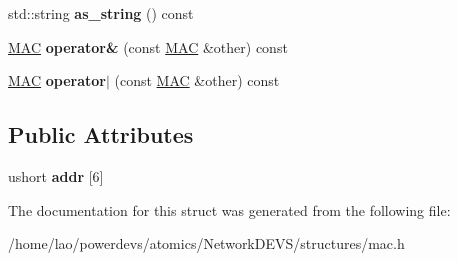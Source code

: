 \begin{DoxyCompactItemize}
\item 
std\+::string {\bfseries as\+\_\+string} () const \hypertarget{structMAC_aa298c6eb1ca7114f8a126e260a40548a}{}\label{structMAC_aa298c6eb1ca7114f8a126e260a40548a}

\item 
\hyperlink{structMAC}{M\+AC} {\bfseries operator\&} (const \hyperlink{structMAC}{M\+AC} \&other) const \hypertarget{structMAC_a7faadff868aa091167276de4bb83f173}{}\label{structMAC_a7faadff868aa091167276de4bb83f173}

\item 
\hyperlink{structMAC}{M\+AC} {\bfseries operator$\vert$} (const \hyperlink{structMAC}{M\+AC} \&other) const \hypertarget{structMAC_aa49ae253b26728ec7dd0c434b286a058}{}\label{structMAC_aa49ae253b26728ec7dd0c434b286a058}

\end{DoxyCompactItemize}
\subsection*{Public Attributes}
\begin{DoxyCompactItemize}
\item 
ushort {\bfseries addr} \mbox{[}6\mbox{]}\hypertarget{structMAC_ab531c8e187a772159d8bcb887ed482a8}{}\label{structMAC_ab531c8e187a772159d8bcb887ed482a8}

\end{DoxyCompactItemize}


The documentation for this struct was generated from the following file\+:\begin{DoxyCompactItemize}
\item 
/home/lao/powerdevs/atomics/\+Network\+D\+E\+V\+S/structures/mac.\+h\end{DoxyCompactItemize}

